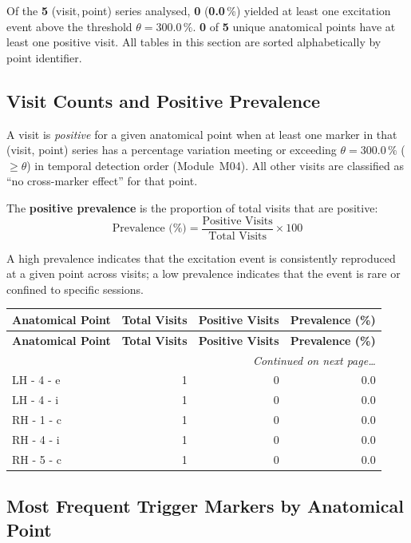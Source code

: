 \documentclass[a4paper,11pt]{article}
\begin{document}
\noindent
Of the \textbf{5} (visit,\,point) series analysed,
\textbf{0} (\textbf{0.0}\,\%) yielded at least one
excitation event above the threshold $\theta = 300.0\,\%$.
\textbf{0} of \textbf{5} unique anatomical points
have at least one positive visit.
All tables in this section are sorted alphabetically by point identifier.

\subsection{Visit Counts and Positive Prevalence}

A visit is \emph{positive} for a given anatomical point when at least one marker in that
(visit, point) series has a percentage variation meeting or exceeding
$\theta = 300.0\,\%$ ($\geq \theta$) in temporal detection order (Module~M04).
All other visits are classified as ``no cross-marker effect'' for that point.

The \textbf{positive prevalence} is the proportion of total visits that are positive:
\[
  \text{Prevalence (\%)} = \frac{\text{Positive Visits}}{\text{Total Visits}} \times 100
\]

A high prevalence indicates that the excitation event is consistently reproduced at a given
point across visits; a low prevalence indicates that the event is rare or confined to
specific sessions.

\begin{small}
\begin{longtable}{p{5cm}rrr}
\toprule
\textbf{Anatomical Point} &
\textbf{Total Visits} &
\textbf{Positive Visits} &
\textbf{Prevalence (\%)} \\
\midrule
\endfirsthead
\toprule
\textbf{Anatomical Point} &
\textbf{Total Visits} &
\textbf{Positive Visits} &
\textbf{Prevalence (\%)} \\
\midrule
\endhead
\midrule
\multicolumn{4}{r}{\small\emph{Continued on next page\ldots}} \\
\endfoot
\bottomrule
\endlastfoot
LH - 4 - e & 1 & 0 & 0.0 \\
LH - 4 - i & 1 & 0 & 0.0 \\
RH - 1 - c & 1 & 0 & 0.0 \\
RH - 4 - i & 1 & 0 & 0.0 \\
RH - 5 - c & 1 & 0 & 0.0 \\
\end{longtable}
\end{small}

\subsection{Most Frequent Trigger Markers by Anatomical Point}
\end{document}
